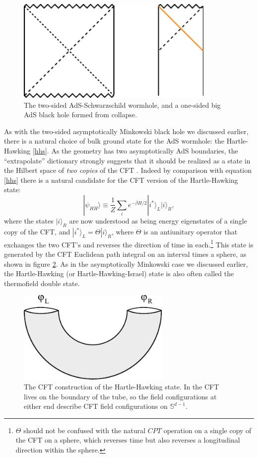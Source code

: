 \documentclass[12pt]{article}
\newcommand{\be}{\begin{equation}}
\newcommand{\ee}{\end{equation}}
\newcommand{\ran}{\rangle}
\begin{document}
\begin{figure}
\begin{center}
\includegraphics[height=5cm]{ads2.pdf}
\caption{The two-sided AdS-Schwarzschild wormhole, and a one-sided big AdS black hole formed from collapse.}\label{ads2}
\end{center}
\end{figure}

As with the two-sided asymptotically Minkowski black hole we discussed earlier, there is a natural choice of bulk ground state for the AdS wormhole: the Hartle-Hawking \eqref{hhs}.  As the geometry has two asymptotically AdS boundaries, the ``extrapolate'' dictionary strongly suggests that it should be realized as a state in the Hilbert space of \textit{two copies} of the CFT \cite{Maldacena:2001kr}.  Indeed by comparison with equation \eqref{hhs} there is a natural candidate for the CFT version of the Hartle-Hawking state:
\be\label{CFTHH}
|\psi_{HH}\ran\equiv \frac{1}{Z}\sum_i e^{-\beta H/2}|i^*\ran_L|i\ran_R,
\ee
where the states $|i\ran_R$ are now understood as being energy eigenstates of a single copy of the CFT, and $|i^*\ran_L=\Theta|i\ran_R$, where $\Theta$ is an antiunitary operator that exchanges the two CFT's and reverses the direction of time in each.\footnote{$\Theta$ should not be confused with the natural $CPT$ operation on a single copy of the CFT on a sphere, which reverses time but also reverses a longitudinal direction within the sphere.}  This state is generated by the CFT Euclidean path integral on an interval times a sphere, as shown in figure \ref{cfthh}.  As in the asymptotically Minkowski case we discussed earlier, the Hartle-Hawking (or Hartle-Hawking-Israel) state is also often called the thermofield double state. 
\begin{figure}
\begin{center}
\includegraphics[height=4.5cm]{cfthh.pdf}
\caption{The CFT construction of the Hartle-Hawking state.  In the CFT lives on the boundary of the tube, so the field configurations at either end describe CFT field configurations on $\mathbb{S}^{d-1}$.}\label{cfthh}
\end{center}
\end{figure}
\end{document}
